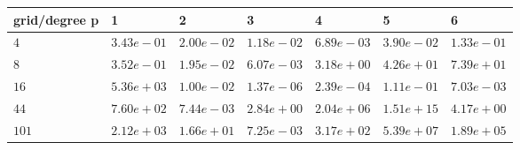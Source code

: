 \begin{tabular}{lllllll}
\hline
 grid/degree p   & 1          & 2          & 3          & 4          & 5          & 6          \\
\hline
 $4$             & $3.43e-01$ & $2.00e-02$ & $1.18e-02$ & $6.89e-03$ & $3.90e-02$ & $1.33e-01$ \\
 $8$             & $3.52e-01$ & $1.95e-02$ & $6.07e-03$ & $3.18e+00$ & $4.26e+01$ & $7.39e+01$ \\
 $16$            & $5.36e+03$ & $1.00e-02$ & $1.37e-06$ & $2.39e-04$ & $1.11e-01$ & $7.03e-03$ \\
 $44$            & $7.60e+02$ & $7.44e-03$ & $2.84e+00$ & $2.04e+06$ & $1.51e+15$ & $4.17e+00$ \\
 $101$           & $2.12e+03$ & $1.66e+01$ & $7.25e-03$ & $3.17e+02$ & $5.39e+07$ & $1.89e+05$ \\
\hline
\end{tabular}